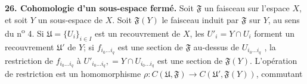 \textbf{26. Cohomologie d'un sous-espace fermé.} Soit $\mathfrak{F}$ un faisceau sur l'espace $X$, et soit $Y$ un sous-espace de $X$. Soit $\mathfrak{F}(Y)$ le faisceau induit par $\mathfrak{F}$ sur $Y$, au sens du n\textsuperscript{o} 4. Si $\mathfrak{U} = \{U_i\}_{i \in I}$ est un recouvrement de $X$, les $U'_i = Y \cap U_i$ forment un recouvrement $\mathfrak{U}'$ de $Y$; si $f_{i_0 \ldots i_q}$ est une section de $\mathfrak{F}$ au-dessus de $U_{i_0 \ldots i_q}$ , la restriction de $f_{i_0 \ldots i_q}$ à $U'_{i_0 \ldots i_q},= Y \cap U_{i_0 \ldots i_q}$ est une section de $\mathfrak{F}(Y)$. L'opération de restriction est un homomorphisme $\rho: C(\mathfrak{U}, \mathfrak{F}) \rightarrow C(\mathfrak{U}', \mathfrak{F}(Y))$, commutant
